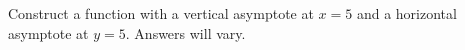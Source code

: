 {Construct a function with a vertical asymptote at $x=5$ and a horizontal asymptote at $y=5$.}
{Answers will vary.}
